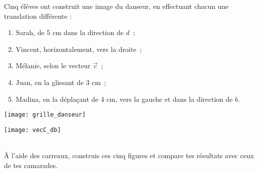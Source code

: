\begin{activite}

Cinq élèves ont construit une image du danseur, en effectuant chacun une translation différente :
\begin{enumerate}
 \item Sarah, de 5 cm dans la direction de $d$ ;
 \item Vincent, horizontalement, vers la droite ;
 \item Mélanie, selon le vecteur $\vec{c}$ ;
 \item Juan, en la glissant de 3 cm ;
 \item Madina, en la déplaçant de 4 cm, vers la gauche et dans la direction de $b$.
 \end{enumerate}
 \begin{minipage}[c]{0.58\linewidth}
  \texttt{[image: grille\_danseur]} 
  \end{minipage} \hfill%
  \begin{minipage}[c]{0.28\linewidth}
  \texttt{[image: vecC\_db]}
  \end{minipage} \\
À l'aide des carreaux, construis ces cinq figures et compare tes résultats avec ceux de tes camarades.

\end{activite}


